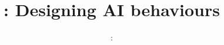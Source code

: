 
\usepackage{../../beamerthemeFalmouthGamesAcademy}
\usepackage{multimedia}
\graphicspath{ {../../} }

\lstset{language=[Sharp]C
}

\usepackage[normalem]{ulem}
\usepackage{wasysym}

\usepackage{algpseudocode}

\usepackage{pdfpages}

\usetikzlibrary{arrows,automata}

\usepackage{qtree}




\title{\sessionnumber: Designing AI behaviours}
\subtitle{\modulecode: \moduletitle}

\frame{\titlepage} 




%


